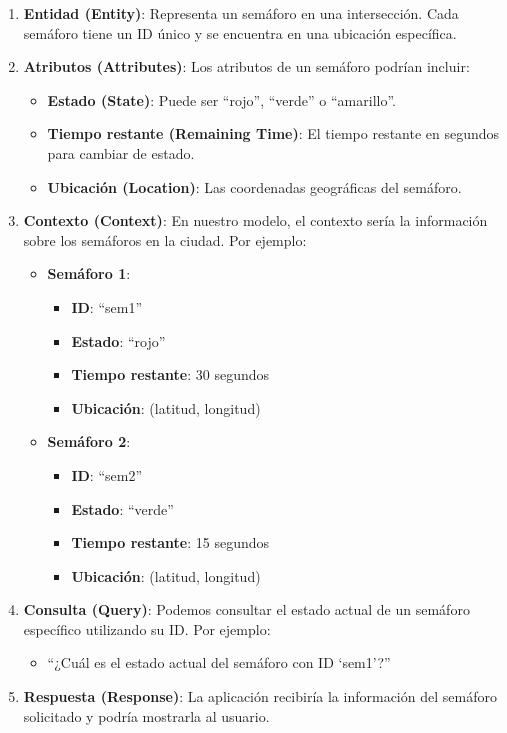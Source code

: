 \begin{enumerate}
    \item \textbf{Entidad (Entity)}: Representa un semáforo en una intersección. Cada semáforo tiene un ID único y se encuentra en una ubicación específica.
    \item \textbf{Atributos (Attributes)}: Los atributos de un semáforo podrían incluir:
        \begin{itemize}
            \item \textbf{Estado (State)}: Puede ser “rojo”, “verde” o “amarillo”.
            \item \textbf{Tiempo restante (Remaining Time)}: El tiempo restante en segundos para cambiar de estado.
            \item \textbf{Ubicación (Location)}: Las coordenadas geográficas del semáforo.
        \end{itemize}
    \item \textbf{Contexto (Context)}: En nuestro modelo, el contexto sería la información sobre los semáforos en la ciudad. Por ejemplo:
        \begin{itemize}
            \item \textbf{Semáforo 1}:
                \begin{itemize}
                    \item \textbf{ID}: “sem1”
                    \item \textbf{Estado}: “rojo”
                    \item \textbf{Tiempo restante}: 30 segundos
                    \item \textbf{Ubicación}: (latitud, longitud)
                \end{itemize}
            \item \textbf{Semáforo 2}:
                \begin{itemize}
                    \item \textbf{ID}: “sem2”
                    \item \textbf{Estado}: “verde”
                    \item \textbf{Tiempo restante}: 15 segundos
                    \item \textbf{Ubicación}: (latitud, longitud)
                \end{itemize}
        \end{itemize}
    \item \textbf{Consulta (Query)}: Podemos consultar el estado actual de un semáforo específico utilizando su ID. Por ejemplo:
        \begin{itemize}
            \item “¿Cuál es el estado actual del semáforo con ID ‘sem1’?”
        \end{itemize}
    \item \textbf{Respuesta (Response)}: La aplicación recibiría la información del semáforo solicitado y podría mostrarla al usuario.
\end{enumerate}

